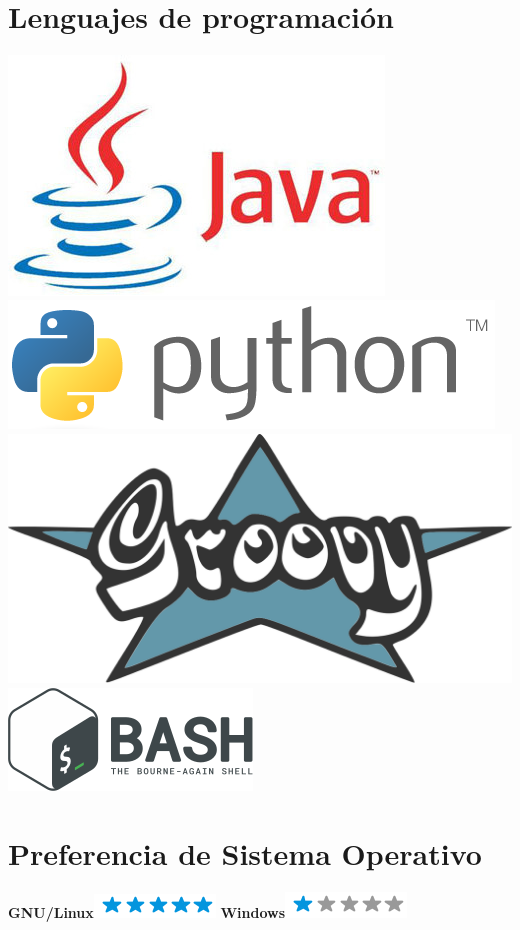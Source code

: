 \documentclass[]{friggeri-cv}
\begin{document}
\begin{aside}
    ~
    ~
    \section{Lenguajes de programaci\'on}
    \includegraphics[scale=0.20]{img/java}
    \includegraphics[scale=0.15]{img/python}
    \includegraphics[scale=0.07]{img/groovy}
    \includegraphics[scale=0.3]{img/bash}
    ~
    ~
    \section{Preferencia de Sistema Operativo}
    \textbf{GNU/Linux}\includegraphics[scale=0.40]{img/5stars.png}
    \textbf{Windows}\includegraphics[scale=0.40]{img/1stars.png}
    ~

\end{aside}
\end{document}
